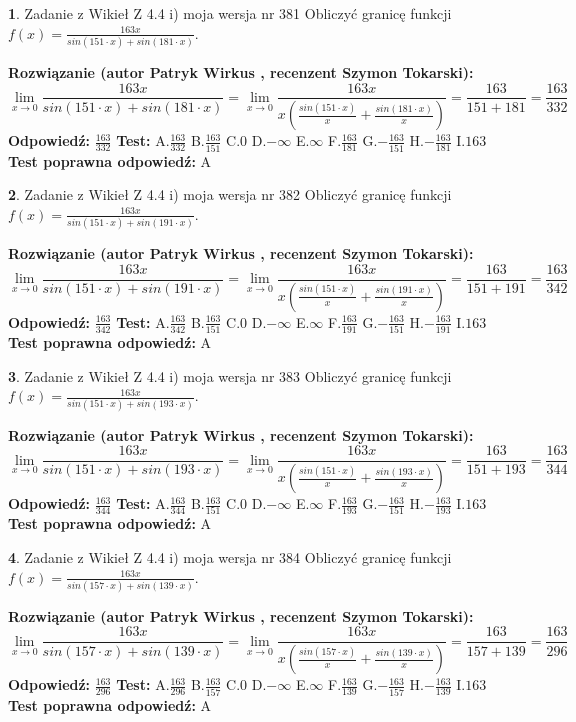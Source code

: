 \documentclass[12pt, a4paper]{article}
\theoremstyle{definition} %
\newtheorem{zad}{}
\newcommand{\zadStart}[1]{\begin{zad}#1\newline}
\newcommand{\zadStop}{\end{zad}}
\newcommand{\rozwStart}[2]{\noindent \textbf{Rozwiązanie (autor #1 , recenzent #2): }\newline}
\newcommand{\rozwStop}{\newline}
\newcommand{\odpStart}{\noindent \textbf{Odpowiedź:}\newline}
\newcommand{\odpStop}{\newline}
\newcommand{\testStart}{\noindent \textbf{Test:}\newline}
\newcommand{\testStop}{\newline}
\newcommand{\kluczStart}{\noindent \textbf{Test poprawna odpowiedź:}\newline}
\newcommand{\kluczStop}{\newline}
\begin{document}
\zadStart{Zadanie z Wikieł Z 4.4 i) moja wersja nr 381}
Obliczyć granicę funkcji $f(x)=\frac{163x}{sin(151\cdot x) +sin(181\cdot x)}$.
\zadStop
\rozwStart{Patryk Wirkus}{Szymon Tokarski}
$$\lim\limits_{x\to 0}\frac{163x}{sin(151\cdot x) +sin(181\cdot x)}=\lim\limits_{x\to 0}\frac{163x}{x(\frac{sin(151\cdot x)}{x}+\frac{sin(181\cdot x)}{x})}=\frac{163}{151+181} = \frac{163}{332}$$
\rozwStop
\odpStart
$\frac{163}{332}$
\odpStop
\testStart
A.$\frac{163}{332}$
B.$\frac{163}{151}$
C.$0$
D.$-\infty$
E.$\infty$
F.$\frac{163}{181}$
G.$-\frac{163}{151}$
H.$-\frac{163}{181}$
I.$163$
\testStop
\kluczStart
A
\kluczStop



\zadStart{Zadanie z Wikieł Z 4.4 i) moja wersja nr 382}
Obliczyć granicę funkcji $f(x)=\frac{163x}{sin(151\cdot x) +sin(191\cdot x)}$.
\zadStop
\rozwStart{Patryk Wirkus}{Szymon Tokarski}
$$\lim\limits_{x\to 0}\frac{163x}{sin(151\cdot x) +sin(191\cdot x)}=\lim\limits_{x\to 0}\frac{163x}{x(\frac{sin(151\cdot x)}{x}+\frac{sin(191\cdot x)}{x})}=\frac{163}{151+191} = \frac{163}{342}$$
\rozwStop
\odpStart
$\frac{163}{342}$
\odpStop
\testStart
A.$\frac{163}{342}$
B.$\frac{163}{151}$
C.$0$
D.$-\infty$
E.$\infty$
F.$\frac{163}{191}$
G.$-\frac{163}{151}$
H.$-\frac{163}{191}$
I.$163$
\testStop
\kluczStart
A
\kluczStop



\zadStart{Zadanie z Wikieł Z 4.4 i) moja wersja nr 383}
Obliczyć granicę funkcji $f(x)=\frac{163x}{sin(151\cdot x) +sin(193\cdot x)}$.
\zadStop
\rozwStart{Patryk Wirkus}{Szymon Tokarski}
$$\lim\limits_{x\to 0}\frac{163x}{sin(151\cdot x) +sin(193\cdot x)}=\lim\limits_{x\to 0}\frac{163x}{x(\frac{sin(151\cdot x)}{x}+\frac{sin(193\cdot x)}{x})}=\frac{163}{151+193} = \frac{163}{344}$$
\rozwStop
\odpStart
$\frac{163}{344}$
\odpStop
\testStart
A.$\frac{163}{344}$
B.$\frac{163}{151}$
C.$0$
D.$-\infty$
E.$\infty$
F.$\frac{163}{193}$
G.$-\frac{163}{151}$
H.$-\frac{163}{193}$
I.$163$
\testStop
\kluczStart
A
\kluczStop



\zadStart{Zadanie z Wikieł Z 4.4 i) moja wersja nr 384}
Obliczyć granicę funkcji $f(x)=\frac{163x}{sin(157\cdot x) +sin(139\cdot x)}$.
\zadStop
\rozwStart{Patryk Wirkus}{Szymon Tokarski}
$$\lim\limits_{x\to 0}\frac{163x}{sin(157\cdot x) +sin(139\cdot x)}=\lim\limits_{x\to 0}\frac{163x}{x(\frac{sin(157\cdot x)}{x}+\frac{sin(139\cdot x)}{x})}=\frac{163}{157+139} = \frac{163}{296}$$
\rozwStop
\odpStart
$\frac{163}{296}$
\odpStop
\testStart
A.$\frac{163}{296}$
B.$\frac{163}{157}$
C.$0$
D.$-\infty$
E.$\infty$
F.$\frac{163}{139}$
G.$-\frac{163}{157}$
H.$-\frac{163}{139}$
I.$163$
\testStop
\kluczStart
A
\kluczStop
\end{document}
